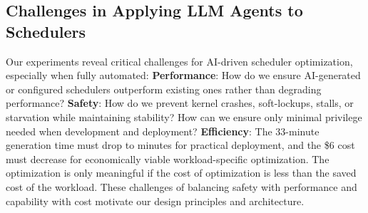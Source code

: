\subsection{Challenges in Applying LLM Agents to Schedulers}

Our experiments reveal critical challenges for AI-driven scheduler optimization, especially when fully automated: \textbf{Performance}: How do we ensure AI-generated or configured schedulers outperform existing ones rather than degrading performance? \textbf{Safety}: How do we prevent kernel crashes, soft-lockups, stalls, or starvation while maintaining stability? How can we ensure only minimal privilege needed when development and deployment? \textbf{Efficiency}: The 33-minute generation time must drop to minutes for practical deployment, and the \$6 cost must decrease for economically viable workload-specific optimization. The optimization is only meaningful if the cost of optimization is less than the saved cost of the workload. These challenges of balancing safety with performance and capability with cost motivate our design principles and architecture.